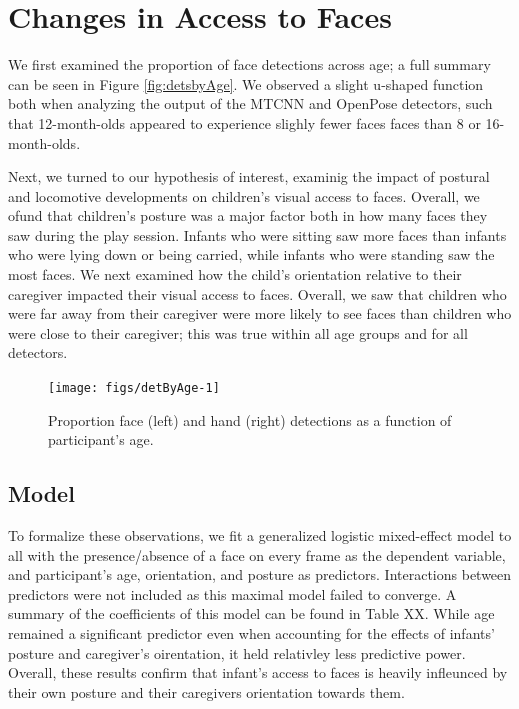 \documentclass[10pt, letterpaper]{article}
\newenvironment{CodeChunk}{}{}
\begin{document}
\section{Changes in Access to Faces}\label{changes-in-access-to-faces}

We first examined the proportion of face detections across age; a full
summary can be seen in Figure \ref{fig:detsbyAge}. We observed a slight
u-shaped function both when analyzing the output of the MTCNN and
OpenPose detectors, such that 12-month-olds appeared to experience
slighly fewer faces faces than 8 or 16-month-olds.

Next, we turned to our hypothesis of interest, examinig the impact of
postural and locomotive developments on children's visual access to
faces. Overall, we ofund that children's posture was a major factor both
in how many faces they saw during the play session. Infants who were
sitting saw more faces than infants who were lying down or being
carried, while infants who were standing saw the most faces. We next
examined how the child's orientation relative to their caregiver
impacted their visual access to faces. Overall, we saw that children who
were far away from their caregiver were more likely to see faces than
children who were close to their caregiver; this was true within all age
groups and for all detectors.

\begin{CodeChunk}
\begin{figure}[h]

{\centering \texttt{[image: figs/detByAge-1]} 

}

\caption[Proportion face (left) and hand (right) detections as a function of participant's age]{Proportion face (left) and hand (right) detections as a function of participant's age.}\label{fig:detByAge}
\end{figure}
\end{CodeChunk}

\subsection{Model}\label{model}

To formalize these observations, we fit a generalized logistic
mixed-effect model to all with the presence/absence of a face on every
frame as the dependent variable, and participant's age, orientation, and
posture as predictors. Interactions between predictors were not included
as this maximal model failed to converge. A summary of the coefficients
of this model can be found in Table XX. While age remained a significant
predictor even when accounting for the effects of infants' posture and
caregiver's oirentation, it held relativley less predictive power.
Overall, these results confirm that infant's access to faces is heavily
infleunced by their own posture and their caregivers orientation towards
them.
\end{document}
